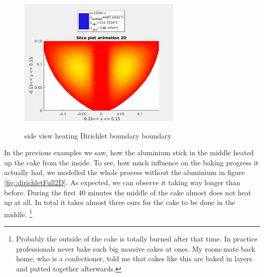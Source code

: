 \begin{figure}[htp]
{	\includegraphics[width=0.69\textwidth]{figures/dirichlet_heat_200_2D121.png}
	}
	\caption{\label{fig::dirichletHeat2D} side view heating Dirichlet boundary boundary}
\end{figure}

In the previous examples we saw, how the aluminium stick in the middle heated up the cake from the inside. To see, how much influence on the baking progress it actually had, we modelled the whole process without the aluminium in figure \ref{fig::dirichletFull2D}. As expected, we can observe it taking way longer than before. During the first 40 minutes the middle of the cake almost does not heat up at all. In total it takes almost three ours for the cake to be done in the middle. \footnote{Probably the outside of the cake is totally burned after that time. In practice professionals never bake such big massive cakes at ones. My room-mate back home, who is a confectioner, told me that cakes like this are baked in layers and putted together afterwards.}

